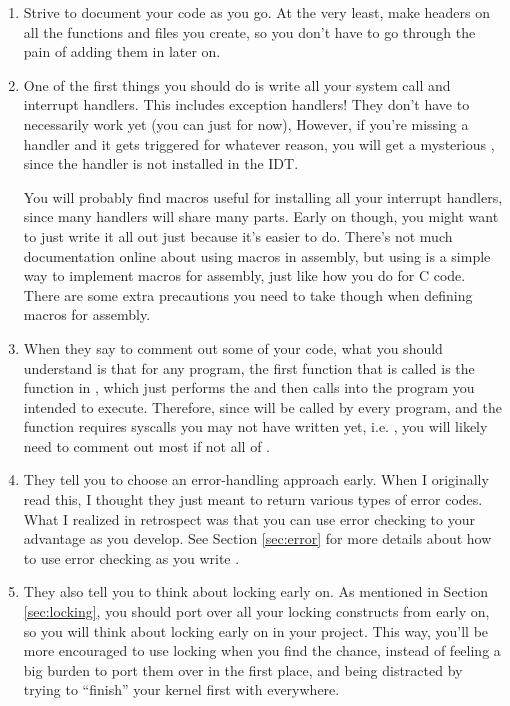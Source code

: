 \documentclass{article}
\begin{document}
\begin{enumerate}
  \item Strive to document your code as you go. At the very least,
  make  headers on all the functions and files you create,
  so you don't have to go through the pain of adding them in later on.

  \item One of the first things you should do is write all your system call and interrupt handlers.
  This includes exception handlers! They don't have to necessarily work yet (you can just  for now),
  However, if you're missing a handler and it gets triggered for whatever
  reason, you will get a mysterious , since the handler is not installed
  in the IDT.

  You will probably find macros useful for installing all your interrupt handlers, since 
  many handlers will share many parts. Early on though, you might want to just write it all out
  just because it's easier to do. There's not much documentation online about using macros
  in assembly, but using  is a simple way to implement macros for assembly,
  just like how you do for C code. There are some extra precautions you need to take though when
  defining macros for assembly.

  \item When they say to comment out some of your  code,
  what you should understand is that for any program, the first function that is called
  is the function in , which just performs the  and
  then calls  into the program you intended to execute. Therefore, since 
   will be called by every program, and the function requires syscalls
  you may not have written yet, i.e. , you will likely need to comment out most
  if not all of .

  \label{tip:autostack}

  \item They tell you to choose an error-handling approach early. When I originally
  read this, I thought they just meant to return various types of error codes.
  What I realized in retrospect was that you can use error checking to your advantage as you
  develop. See Section \ref{sec:error} for more details about how to use error checking
  as you write .

  \item They also tell you to think about locking early on. As mentioned in Section \ref{sec:locking},
  you should port over all your locking constructs from  early on, so you will think 
  about locking early on in your project. This way, you'll be more encouraged to use locking when you find
  the chance, instead of feeling a big burden to port them over in the first place, and being distracted 
  by trying to ``finish'' your kernel first with  everywhere.


\end{enumerate}
\end{document}
